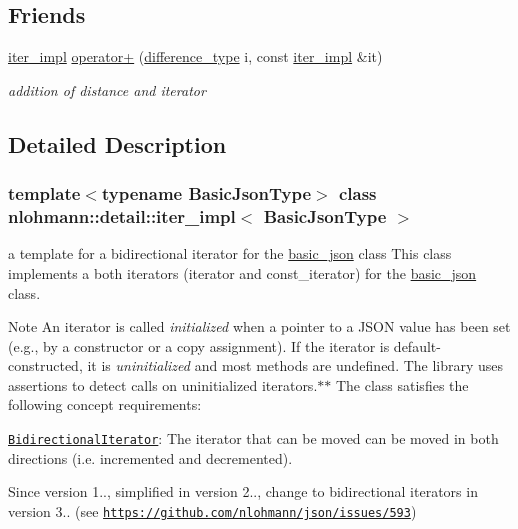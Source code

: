 \subsection*{Friends}
\begin{DoxyCompactItemize}
\item 
\hyperlink{classnlohmann_1_1detail_1_1iter__impl}{iter\+\_\+impl} \hyperlink{classnlohmann_1_1detail_1_1iter__impl_a94108d1a7563e103534f23eb5c1ee175}{operator+} (\hyperlink{classnlohmann_1_1detail_1_1iter__impl_a2f7ea9f7022850809c60fc3263775840}{difference\+\_\+type} i, const \hyperlink{classnlohmann_1_1detail_1_1iter__impl}{iter\+\_\+impl} \&it)
\begin{DoxyCompactList}\small\item\em addition of distance and iterator \end{DoxyCompactList}\end{DoxyCompactItemize}


\subsection{Detailed Description}
\subsubsection*{template$<$typename Basic\+Json\+Type$>$\newline
class nlohmann\+::detail\+::iter\+\_\+impl$<$ Basic\+Json\+Type $>$}

a template for a bidirectional iterator for the \hyperlink{classnlohmann_1_1basic__json}{basic\+\_\+json} class This class implements a both iterators (iterator and const\+\_\+iterator) for the \hyperlink{classnlohmann_1_1basic__json}{basic\+\_\+json} class. 

\begin{DoxyNote}{Note}
An iterator is called {\itshape initialized} when a pointer to a J\+S\+ON value has been set (e.\+g., by a constructor or a copy assignment). If the iterator is default-\/constructed, it is {\itshape uninitialized} and most methods are undefined. The library uses assertions to detect calls on uninitialized iterators.$\ast$$\ast$  The class satisfies the following concept requirements\+:
\begin{DoxyItemize}
\item \href{https://en.cppreference.com/w/cpp/named_req/BidirectionalIterator}{\tt Bidirectional\+Iterator}\+: The iterator that can be moved can be moved in both directions (i.\+e. incremented and decremented). 
\end{DoxyItemize}
\end{DoxyNote}
\begin{DoxySince}{Since}
version 1.., simplified in version 2.., change to bidirectional iterators in version 3.. (see \href{https://github.com/nlohmann/json/issues/593}{\tt https\+://github.\+com/nlohmann/json/issues/593}) 
\end{DoxySince}


